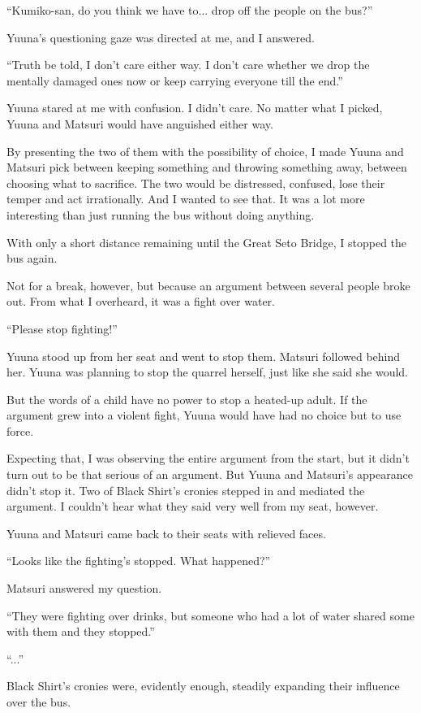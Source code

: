 ``Kumiko-san, do you think we have to... drop off the people on the bus?''

Yuuna's questioning gaze was directed at me, and I answered.

``Truth be told, I don't care either way. I don't care whether we drop the mentally damaged ones now or keep carrying everyone till the end.''

Yuuna stared at me with confusion. I didn't care. No matter what I picked, Yuuna and Matsuri would have anguished either way.

By presenting the two of them with the possibility of choice, I made Yuuna and Matsuri pick between keeping something and throwing something away, between choosing what to sacrifice. The two would be distressed, confused, lose their temper and act irrationally. And I wanted to see that. It was a lot more interesting than just running the bus without doing anything.

With only a short distance remaining until the Great Seto Bridge, I stopped the bus again.

Not for a break, however, but because an argument between several people broke out. From what I overheard, it was a fight over water.

``Please stop fighting!''

Yuuna stood up from her seat and went to stop them. Matsuri followed behind her. Yuuna was planning to stop the quarrel herself, just like she said she would.

But the words of a child have no power to stop a heated-up adult. If the argument grew into a violent fight, Yuuna would have had no choice but to use force.

Expecting that, I was observing the entire argument from the start, but it didn't turn out to be that serious of an argument. But Yuuna and Matsuri's appearance didn't stop it. Two of Black Shirt's cronies stepped in and mediated the argument. I couldn't hear what they said very well from my seat, however.

Yuuna and Matsuri came back to their seats with relieved faces.

``Looks like the fighting's stopped. What happened?''

Matsuri answered my question.

``They were fighting over drinks, but someone who had a lot of water shared some with them and they stopped.''

``...''

Black Shirt's cronies were, evidently enough, steadily expanding their influence over the bus.

